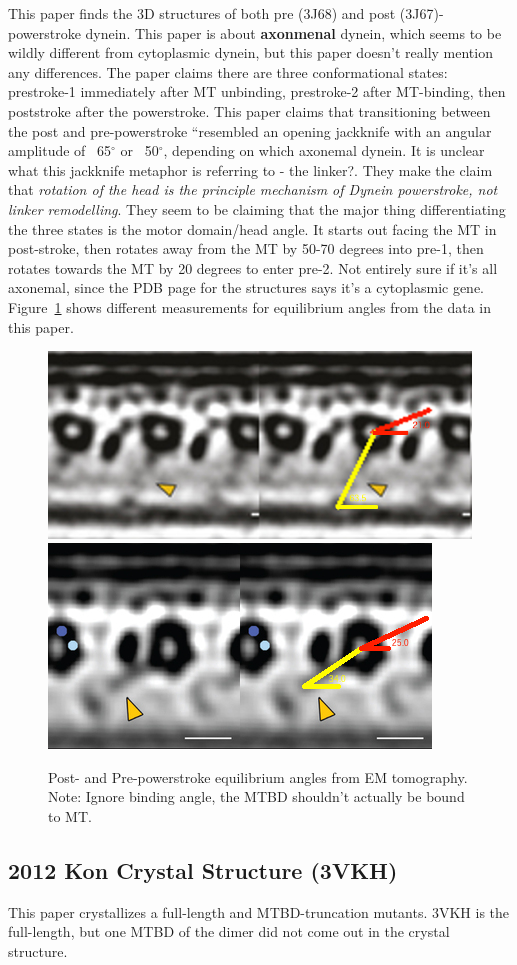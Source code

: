 \documentclass[10pt]{article} %
\begin{document}
This paper finds the 3D structures of both pre (3J68) and post (3J67)-powerstroke dynein. This paper is about \textbf{axonmenal} dynein, which seems to be wildly different from cytoplasmic dynein, but this paper doesn't really mention any differences. The paper claims there are three conformational states: prestroke-1 immediately after MT unbinding, prestroke-2 after MT-binding, then poststroke after the powerstroke. This paper claims that transitioning between the post and pre-powerstroke ``resembled an opening jackknife with an angular amplitude of ~65$^{\circ}$ or ~50$^{\circ}$, depending on which axonemal dynein. It is unclear what this jackknife metaphor is referring to - the linker?. They make the claim that \textit{rotation of the head is the principle mechanism of Dynein powerstroke, not linker remodelling}. They seem to be claiming that the major thing differentiating the three states is the motor domain/head angle. It starts out facing the MT in post-stroke, then rotates away from the MT by 50-70 degrees into pre-1, then rotates towards the MT by 20 degrees to enter pre-2. Not entirely sure if it's all axonemal, since the PDB page for the structures says it's a cytoplasmic gene.\\

Figure~\ref{fig:em_tomography_eq_angles} shows different measurements
for equilibrium angles from the data in this paper.
\begin{figure}[h!]
  \centering
  \includegraphics[width=.45\textwidth]{../figures/Post_powerstroke_tomography.jpg}
  \includegraphics[width=.45\textwidth]{../figures/Pre_powerstroke_tomography.jpg}
  \caption{Post- and Pre-powerstroke equilibrium angles from EM tomography. Note: Ignore binding angle, the MTBD shouldn't actually be bound to MT.}
  \label{fig:em_tomography_eq_angles}
\end{figure}

\subsection{2012 Kon Crystal Structure (3VKH)}
This paper crystallizes a full-length and MTBD-truncation mutants. 3VKH is the full-length, but one MTBD of the dimer did not come out in the crystal structure.
\end{document}
